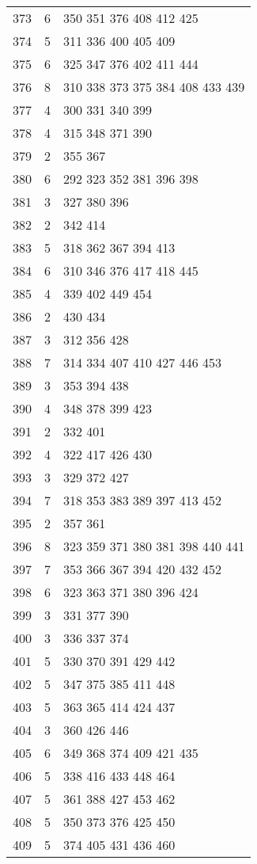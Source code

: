 \documentclass{standalone}
\begin{document}
\begin{tabular}{c c l}
373 & 6 & 350 351 376 408 412 425 \\
374 & 5 & 311 336 400 405 409 \\
375 & 6 & 325 347 376 402 411 444 \\
376 & 8 & 310 338 373 375 384 408 433 439 \\
377 & 4 & 300 331 340 399 \\
378 & 4 & 315 348 371 390 \\
379 & 2 & 355 367 \\
380 & 6 & 292 323 352 381 396 398 \\
381 & 3 & 327 380 396 \\
382 & 2 & 342 414 \\
383 & 5 & 318 362 367 394 413 \\
384 & 6 & 310 346 376 417 418 445 \\
385 & 4 & 339 402 449 454 \\
386 & 2 & 430 434 \\
387 & 3 & 312 356 428 \\
388 & 7 & 314 334 407 410 427 446 453 \\
389 & 3 & 353 394 438 \\
390 & 4 & 348 378 399 423 \\
391 & 2 & 332 401 \\
392 & 4 & 322 417 426 430 \\
393 & 3 & 329 372 427 \\
394 & 7 & 318 353 383 389 397 413 452 \\
395 & 2 & 357 361 \\
396 & 8 & 323 359 371 380 381 398 440 441 \\
397 & 7 & 353 366 367 394 420 432 452 \\
398 & 6 & 323 363 371 380 396 424 \\
399 & 3 & 331 377 390 \\
400 & 3 & 336 337 374 \\
401 & 5 & 330 370 391 429 442 \\
402 & 5 & 347 375 385 411 448 \\
403 & 5 & 363 365 414 424 437 \\
404 & 3 & 360 426 446 \\
405 & 6 & 349 368 374 409 421 435 \\
406 & 5 & 338 416 433 448 464 \\
407 & 5 & 361 388 427 453 462 \\
408 & 5 & 350 373 376 425 450 \\
409 & 5 & 374 405 431 436 460 \\

\end{tabular}
\end{document}
